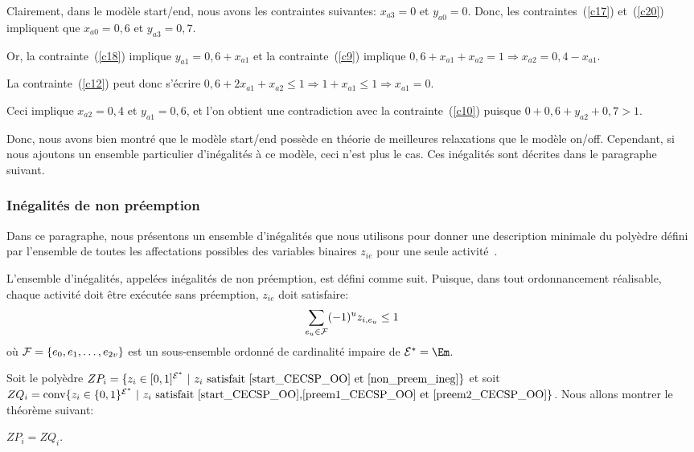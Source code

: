 Clairement, dans le modèle start/end, nous avons les contraintes
suivantes: $x_{a3}=0$ et $y_{a0}=0$. Donc, les contraintes~(\ref{c17})
et~(\ref{c20}) impliquent que $x_{a0}=0,6$ et $y_{a3}=0,7$. 

Or, la contrainte~(\ref{c18}) implique $y_{a1}=0,6+x_{a1}$
et la contrainte~(\ref{c9}) implique $0,6+x_{a1}+x_{a2}=1 \Rightarrow
x_{a2}=0,4-x_{a1}$. 

La contrainte~(\ref{c12}) peut donc s'écrire
$0,6+2x_{a1}+x_{a2}\le 1 \Rightarrow 1+x_{a1}\le 1 \Rightarrow
x_{a1}=0$. 

Ceci implique $x_{a2}=0,4$ et $y_{a1}=0,6$, et l'on obtient
une contradiction avec la contrainte~(\ref{c10}) puisque $0+0,6+y_{a2}+0,7>1$.

Donc, nous avons bien montré que le modèle start/end possède en
théorie de meilleures relaxations que le modèle on/off. Cependant, si
nous ajoutons un ensemble particulier d'inégalités à ce modèle, ceci
n'est plus le cas. Ces inégalités sont décrites dans le paragraphe
suivant.


\subsubsection{Inégalités de non préemption}
\label{sec:nonPreem}

Dans ce paragraphe, nous présentons un ensemble d'inégalités que nous
utilisons pour donner une description minimale du polyèdre défini par
l'ensemble de toutes les affectations possibles des variables binaires
$z_{ie}$ pour une seule activité~\cite{LAASreport}. 

L'ensemble d'inégalités, appelées inégalités de non préemption, est
défini comme suit. Puisque, dans tout ordonnancement réalisable,
chaque activité doit être exécutée sans préemption, $z_{ie}$ doit
satisfaire:
\begin{equation}
  \sum_{e_u \in {\cal F}} (-1)^{u} z_{i,e_u} \le 1
\label{non_preem_ineg}
\end{equation}
où ${\cal F}=\{e_0,e_1,\dots,e_{2v}\}$ est un sous-ensemble ordonné de
cardinalité impaire de $\E^*=\Em$.  

Soit le polyèdre $ZP_i=\{z_i \in [0,1]^{{\cal E}^*}\ | \ z_i\text{ satisfait
\eqref{start_CECSP_OO} et \eqref{non_preem_ineg}}\}$ et soit
$ZQ_i=\mathrm{conv}\{z_i \in \{0,1\}^{{\cal E}^*}\ | \ z_i\text{ satisfait
\eqref{start_CECSP_OO},\eqref{preem1_CECSP_OO} et
\eqref{preem2_CECSP_OO}}\}$. Nous allons montrer le théorème suivant: 

\begin{theo}
$ZP_i=ZQ_i$.
\end{theo}

